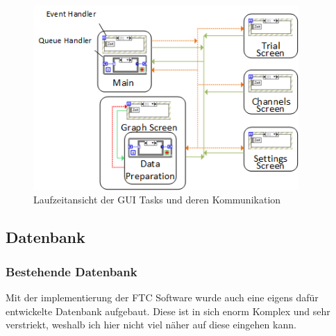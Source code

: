 \documentclass[10pt]{scrartcl}
\begin{document}
\begin{figure}[htbp] 
	\centering
	\includegraphics[width=0.9\textwidth]{Laufzeitansicht}
	\caption{Laufzeitansicht der GUI Tasks und deren Kommunikation}
	\label{fig:LaufzeitansichtUDA}
\end{figure}

\subsection{Datenbank}
\subsubsection{Bestehende Datenbank}
Mit der implementierung der FTC Software wurde auch eine eigens dafür entwickelte Datenbank aufgebaut. Diese ist in sich enorm Komplex und sehr verstriekt, weshalb ich hier nicht viel näher auf diese eingehen kann.
\end{document}

